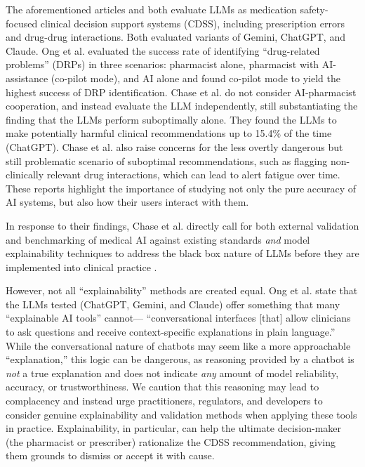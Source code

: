 \documentclass[authoryear,preprint,12pt]{elsarticle}
\begin{document}
The aforementioned articles \cite{ongLargeLanguageModel2025} and
\cite{chaseEvaluationLargeLanguage2025} both evaluate LLMs as medication
safety-focused clinical decision support systems (CDSS), including prescription
errors and drug-drug interactions. Both evaluated variants of Gemini, ChatGPT,
and Claude. Ong et al. \cite{ongLargeLanguageModel2025} evaluated the success
rate of identifying ``drug-related problems'' (DRPs) in three scenarios:
pharmacist alone, pharmacist with AI-assistance (co-pilot mode), and AI alone
and found co-pilot mode to yield the highest success of DRP identification.
Chase et al. \cite{chaseEvaluationLargeLanguage2025} do not consider
AI-pharmacist cooperation, and instead evaluate the LLM independently, still
substantiating the finding that the LLMs perform suboptimally alone. They found
the LLMs to make potentially harmful clinical recommendations up to 15.4\% of
the time (ChatGPT). Chase et al. \cite{chaseEvaluationLargeLanguage2025} also
raise concerns for the less overtly dangerous but still problematic scenario of
suboptimal recommendations, such as flagging non-clinically relevant drug
interactions, which can lead to alert fatigue over time. These reports highlight
the importance of studying not only the pure accuracy of AI systems, but also
how their users interact with them.

In response to their findings, Chase et al. directly call for both external
validation and benchmarking of medical AI against existing standards
\textit{and} model explainability techniques to address the black box nature of
LLMs before they are implemented into clinical practice
\cite{chaseEvaluationLargeLanguage2025}. 

However, not all ``explainability'' methods are created equal. Ong et al.
\cite{ongLargeLanguageModel2025} state that the LLMs tested (ChatGPT, Gemini,
and Claude) offer something that many ``explainable AI tools'' cannot---
``conversational interfaces [that] allow clinicians to ask questions and receive
context-specific explanations in plain language.'' While the conversational
nature of chatbots may seem like a more approachable ``explanation,'' this logic
can be dangerous, as reasoning provided by a chatbot is \textit{not} a true
explanation and does not indicate \textit{any} amount of model reliability,
accuracy, or trustworthiness. We caution that this reasoning may lead to
complacency and instead urge practitioners, regulators, and developers to
consider genuine explainability and validation methods when applying these tools
in practice. Explainability, in particular, can help the ultimate decision-maker
(the pharmacist or prescriber) rationalize the CDSS recommendation, giving them
grounds to dismiss or accept it with cause.
\end{document}
